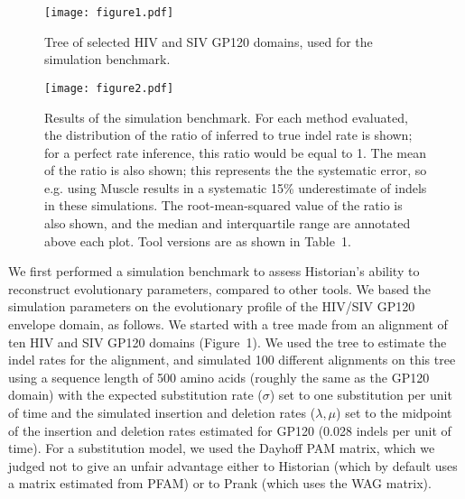 \documentclass{bioinfo}
\begin{document}
\begin{figure}
  \texttt{[image: figure1.pdf]}
  \caption{
    Tree of selected HIV and SIV GP120 domains, used for the simulation benchmark.
  }
\end{figure}

\begin{figure}
  \texttt{[image: figure2.pdf]}
  \caption{
    Results of the simulation benchmark.
    For each method evaluated, the distribution of the ratio of inferred to true
    indel rate is shown; for a perfect rate inference, this ratio would be equal to 1.
    The mean of the ratio is also shown; this represents the the systematic error,
    so e.g. using Muscle results in a systematic 15\% underestimate of indels
    in these simulations.
    The root-mean-squared value of the ratio is also shown,
    and the median and interquartile range are annotated above each plot.
    Tool versions are as shown in Table~1.
  }
\end{figure}

We first performed a simulation benchmark to assess Historian's ability to reconstruct evolutionary parameters,
compared to other tools.
We based the simulation parameters on the evolutionary profile of the HIV/SIV GP120 envelope domain, as follows.
We started with a tree made from an alignment of ten HIV and SIV GP120 domains (Figure~1).
We used the tree to estimate the indel rates for the alignment,
and simulated 100 different alignments on this tree
using a sequence length of 500 amino acids
(roughly the same as the GP120 domain)
with the expected substitution rate ($\sigma$) set to one substitution per unit of time
and the simulated insertion and deletion rates ($\lambda,\mu$)
set to the midpoint of the insertion and deletion rates
estimated for GP120 (0.028 indels per unit of time).
For a substitution model, we used the Dayhoff PAM matrix,
which we judged not to give an unfair advantage either to Historian
(which by default uses a matrix estimated from PFAM)
or to Prank (which uses the WAG matrix).
\end{document}
